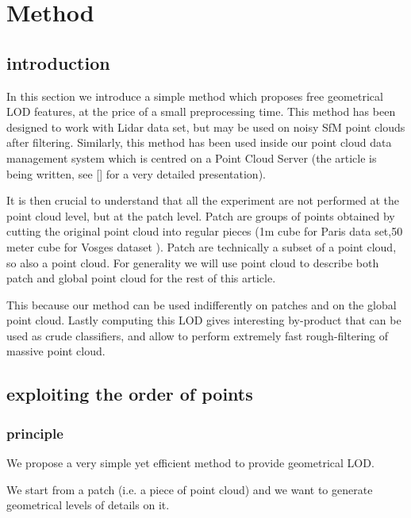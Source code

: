 

\section{Method}
	\subsection{introduction}
	 	In this section we introduce a simple method which proposes free geometrical LOD features, at the price of a small preprocessing time.
	 	This method has been designed to work with Lidar data set, but may be used on noisy SfM point clouds after filtering.
	 	Similarly, this method has been used inside our point cloud data management system which is centred on a Point Cloud Server (the article is being written, see [] for a very detailed presentation).
	 	
	 	It is then crucial to understand that all the experiment are not performed at the point cloud level, but at the patch level. Patch are groups of points obtained by cutting the original point cloud into regular pieces (1m cube for Paris data set,50 meter cube for Vosges dataset ).
	 	Patch are technically a subset of a point cloud, so also a point cloud. For generality we will use point cloud to describe both patch and global point cloud for the rest of this article.
	 	
	 	This because our method can be used indifferently on patches and on the global point cloud.
	 	Lastly computing this LOD gives interesting by-product that can be used as crude classifiers, and allow to perform extremely fast rough-filtering of massive point cloud. 
	 	 
	\subsection{exploiting the order of points }
		\subsubsection{principle}
			We propose a very simple yet efficient method to provide geometrical LOD.
			
			We start from a patch (i.e. a piece of point cloud) and we want to generate geometrical levels of details on it.
			
